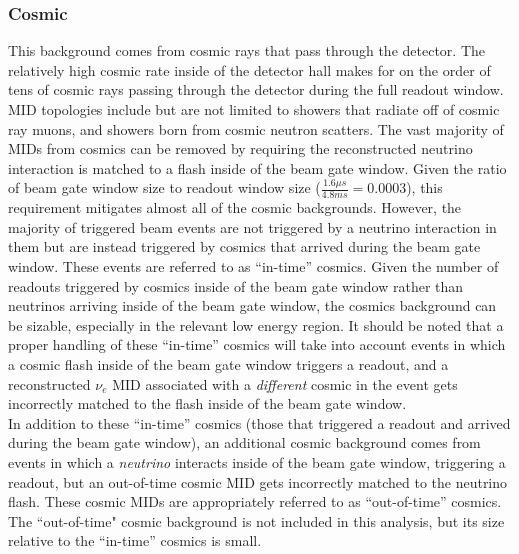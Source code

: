\subsubsection{Cosmic}
This background comes from cosmic rays that pass through the detector. The relatively high cosmic rate inside of the detector hall makes for on the order of tens of cosmic rays passing through the detector during the full readout window. MID topologies include but are not limited to showers that radiate off of cosmic ray muons, and showers born from cosmic neutron scatters. The vast majority of MIDs from cosmics can be removed by requiring the reconstructed neutrino interaction is matched to a flash inside of the beam gate window. Given the ratio of beam gate window size to readout window size ($\frac{1.6\mu s}{4.8ms}=0.0003$), this requirement mitigates almost all of the cosmic backgrounds. However, the majority of triggered beam events are not triggered by a neutrino interaction in them but are instead triggered by cosmics that arrived during the beam gate window. These events are referred to as ``in-time'' cosmics. Given the number of readouts triggered by cosmics inside of the beam gate window rather than neutrinos arriving inside of the beam gate window, the cosmics background can be sizable, especially in the relevant low energy region. It should be noted that a proper handling of these ``in-time'' cosmics will take into account events in which a cosmic flash inside of the beam gate window triggers a readout, and a reconstructed $\nu_e$ MID associated with a \textit{different} cosmic in the event gets incorrectly matched to the flash inside of the beam gate window.\\

In addition to these ``in-time'' cosmics (those that triggered a readout and arrived during the beam gate window), an additional cosmic background comes from events in which a \textit{neutrino} interacts inside of the beam gate window, triggering a readout, but an out-of-time cosmic MID gets incorrectly matched to the neutrino flash. These cosmic MIDs are appropriately referred to as ``out-of-time'' cosmics. The ``out-of-time" cosmic background is not included in this analysis, but its size relative to the ``in-time'' cosmics is small.\\



